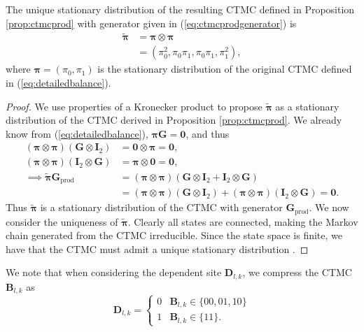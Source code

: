 \begin{proposition}
    The unique stationary distribution of the resulting CTMC defined in Proposition \ref{prop:ctmcprod} with generator given in (\ref{eq:ctmcprodgenerator}) is
    \begin{align}
        \tilde{\boldsymbol{\pi}} &= \boldsymbol{\pi} \otimes \boldsymbol{\pi} \\
        &= (\pi_0^2, \pi_0\pi_1, \pi_0\pi_1, \pi_1^2),
    \end{align}
    where $\boldsymbol{\pi} = (\pi_0, \pi_1)$ is the stationary distribution of the original CTMC defined in (\ref{eq:detailedbalance}).
\end{proposition}
\begin{proof}
    We use properties of a Kronecker product to propose $\tilde{\boldsymbol{\pi}}$ as a stationary distribution of the CTMC derived in Proposition \ref{prop:ctmcprod}. We already know from (\ref{eq:detailedbalance}), $\boldsymbol{\pi}\mathbf{G} = \mathbf{0}$, and thus
    \begin{align}
        (\boldsymbol{\pi} \otimes \boldsymbol{\pi}) (\mathbf{G} \otimes \mathbf{I}_2 ) &= \mathbf{0} \otimes \boldsymbol{\pi} = \mathbf{0}, \\
        (\boldsymbol{\pi} \otimes \boldsymbol{\pi}) (\mathbf{I}_2 \otimes \mathbf{G}) &=\boldsymbol{\pi} \otimes  \mathbf{0} = \mathbf{0}, \\
        \implies \tilde{\boldsymbol{\pi}}\mathbf{G}_{\text{prod}} &= (\boldsymbol{\pi} \otimes \boldsymbol{\pi}) (\mathbf{G} \otimes \mathbf{I}_2 + \mathbf{I}_2 \otimes \mathbf{G}) \\
        &= (\boldsymbol{\pi} \otimes \boldsymbol{\pi}) (\mathbf{G} \otimes \mathbf{I}_2) + (\boldsymbol{\pi} \otimes \boldsymbol{\pi})(\mathbf{I}_2 \otimes \mathbf{G}) = \mathbf{0}.
    \end{align}
    Thus $\tilde{\boldsymbol{\pi}}$ is a stationary distribution of the CTMC with generator $\mathbf{G}_{\text{prod}}$. We now consider the uniqueness of $\tilde{\boldsymbol{\pi}}$. Clearly all states are connected, making the Markov chain generated from the CTMC irreducible. Since the state space is finite, we have that the CTMC must admit a unique stationary distribution \cite{Douc2019}.
\end{proof}

We note that when considering the dependent site $\mathbf{D}_{l, k}$, we compress the CTMC $\mathbf{B}_{l, k}$ as
\begin{equation}
    \mathbf{D}_{l, k} = \begin{cases}
        0 & \mathbf{B}_{l, k} \in \{00, 01, 10\} \\
        1 & \mathbf{B}_{l, k} \in \{11\}.
    \end{cases}
\end{equation}

